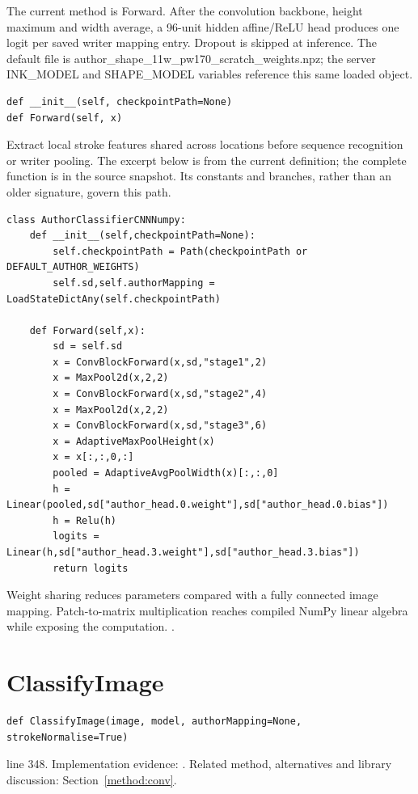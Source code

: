 The current method is Forward. After the convolution backbone, height maximum and width average, a 96-unit hidden affine/ReLU head produces one logit per saved writer mapping entry. Dropout is skipped at inference. The default file is author\_shape\_11w\_pw170\_scratch\_weights.npz; the server INK\_MODEL and SHAPE\_MODEL variables reference this same loaded object.


\begin{lstlisting}[style=plain]
def __init__(self, checkpointPath=None)
def Forward(self, x)
\end{lstlisting}
Extract local stroke features shared across locations before sequence recognition or writer pooling. The excerpt below is from the current definition; the complete function is in the source snapshot. Its constants and branches, rather than an older signature, govern this path.


\begin{lstlisting}[style=plain]
class AuthorClassifierCNNNumpy:
    def __init__(self,checkpointPath=None):
        self.checkpointPath = Path(checkpointPath or DEFAULT_AUTHOR_WEIGHTS)
        self.sd,self.authorMapping = LoadStateDictAny(self.checkpointPath)

    def Forward(self,x):
        sd = self.sd
        x = ConvBlockForward(x,sd,"stage1",2)
        x = MaxPool2d(x,2,2)
        x = ConvBlockForward(x,sd,"stage2",4)
        x = MaxPool2d(x,2,2)
        x = ConvBlockForward(x,sd,"stage3",6)
        x = AdaptiveMaxPoolHeight(x)
        x = x[:,:,0,:]
        pooled = AdaptiveAvgPoolWidth(x)[:,:,0]
        h = Linear(pooled,sd["author_head.0.weight"],sd["author_head.0.bias"])
        h = Relu(h)
        logits = Linear(h,sd["author_head.3.weight"],sd["author_head.3.bias"])
        return logits
\end{lstlisting}
Weight sharing reduces parameters compared with a fully connected image mapping. Patch-to-matrix multiplication reaches compiled NumPy linear algebra while exposing the computation. \cite{shi2017,torchconv,numpystride,numpymatmul}.


\section{ClassifyImage}\label{fn:recognise:ClassifyImage}
\begin{lstlisting}[style=sig]
def ClassifyImage(image, model, authorMapping=None, strokeNormalise=True)
\end{lstlisting}
 line 348. Implementation evidence: \cite{code2026}. Related method, alternatives and library discussion: Section~\ref{method:conv}.


